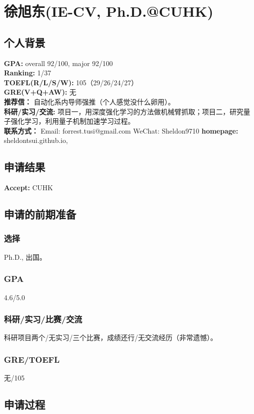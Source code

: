 \documentclass[a4paper,UTF8]{book}
\begin{document}
\clearpage
\section{徐旭东(IE-CV, Ph.D.@CUHK)}
    \subsection*{个人背景}
        \textbf{GPA:} overall 92/100, major 92/100 \\
        \textbf{Ranking:} 1/37\\
        \textbf{TOEFL(R/L/S/W):} 105（29/26/24/27）\\
        \textbf{GRE(V+Q+AW):} 无\\
        \textbf{推荐信：} 自动化系内导师强推（个人感觉没什么卵用）。\\
        \textbf{科研/实习/交流:} 项目一，用深度强化学习的方法做机械臂抓取；项目二，研究量子强化学习，利用量子机制加速学习过程。\\ 
        \textbf{联系方式：} Email: forrest.tusi@gmail.com WeChat: Sheldon9710
        \textbf{homepage: } sheldontsui.github.io, 

    \subsection*{申请结果}
        \textbf{Accept:} CUHK

    \subsection*{申请的前期准备}
        \subsubsection*{选择}
        Ph.D., 出国。
        \subsubsection*{GPA}
        4.6/5.0
        \subsubsection*{科研/实习/比赛/交流}
        科研项目两个/无实习/三个比赛，成绩还行/无交流经历（非常遗憾）。
        \subsubsection*{GRE/TOEFL}
        无/105

    \subsection*{申请过程}
\end{document}
